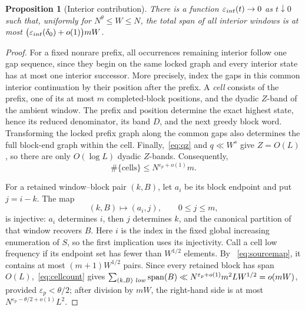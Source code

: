 \documentclass[10pt,a4paper]{amsart}
\newtheorem{proposition}[theorem]{Proposition}
\newcommand{\Span}{\operatorname{span}}
\begin{document}
\begin{proposition}[Interior contribution]\label{prop:interior}
There is a function $\varepsilon_{\rm int}(t)\to0$ as $t\downarrow0$ such
that, uniformly for $N^\theta\le W\le N$, the total span of all interior
windows is at most
$\bigl(\varepsilon_{\rm int}(\delta_0)+o(1)\bigr)mW$.
\end{proposition}

\begin{proof}
For a fixed nonrare prefix, all occurrences remaining interior follow one
gap sequence, since they begin on the same locked graph and every interior
state has at most one interior successor. More precisely, index the gaps in
this common interior continuation by their position after the prefix. A
\emph{cell} consists of the prefix, one of its at most $m$ completed-block
positions, and the dyadic $Z$-band of the ambient window. The prefix and
position determine the exact highest state, hence its reduced denominator,
its band $D$, and the next greedy block word. Transforming the locked prefix
graph along the common gaps also determines the full block-end graph within
the cell. Finally,~\eqref{eq:qz} and $q\ll W^s$ give $Z=O(L)$, so there are
only $O(\log L)$ dyadic $Z$-bands. Consequently,
\begin{equation}\label{eq:cellcount}
 \#\{\text{cells}\}\le N^{\varepsilon_p+o(1)}m.
\end{equation}

For a retained window--block pair $(k,B)$, let $a_i$ be its block endpoint
and put $j=i-k$. The map
\begin{equation}\label{eq:sourcemap}
 (k,B)\longmapsto(a_i,j),\qquad 0\le j\le m,
\end{equation}
is injective: $a_i$ determines $i$, then $j$ determines $k$, and the
canonical partition of that window recovers $B$. Here $i$ is the index in the
fixed global increasing enumeration of $S$, so the first implication uses its
injectivity. Call a cell low frequency
if its endpoint set has fewer than $W^{1/2}$ elements. By
~\eqref{eq:sourcemap}, it contains at most $(m+1)W^{1/2}$ pairs. Since every
retained block has span $O(L)$,~\eqref{eq:cellcount} gives
$\sum_{(k,B)\ {\rm low}}\Span(B)
\ll N^{\varepsilon_p+o(1)}m^2LW^{1/2}=o(mW)$, provided
$\varepsilon_p<\theta/2$; after division by $mW$, the right-hand side is at
most $N^{\varepsilon_p-\theta/2+o(1)}L^2$.


\end{proof}
\end{document}
